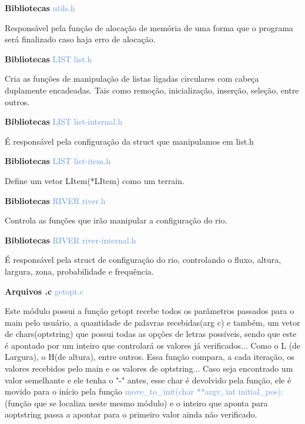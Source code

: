 \documentclass[a4paper,12pt]{article}
\begin{document}
{\Large \textcolor{NavyBlue}{ \textbf{Bibliotecas  }}}{\large \textcolor{CornflowerBlue}{  utils.h}}
\bigskip

Responsável pela função de alocação de memória de uma forma que o programa será finalizado caso haja erro de alocação.


\newpage %

{\Large \textcolor{NavyBlue}{ \textbf{Bibliotecas  }}}{\large \textcolor{CornflowerBlue}{  LIST  list.h}}
\bigskip

Cria as funções de manipulação de listas ligadas circulares com cabeça duplamente encadeadas. Tais como remoção, inicialização, inserção, seleção, entre outros.
\bigskip
\bigskip
\bigskip

{\Large \textcolor{NavyBlue}{ \textbf{Bibliotecas  }}}{\large \textcolor{CornflowerBlue}{  LIST  list-internal.h}}
\bigskip

É responsável pela configuração da struct que manipulamos em list.h
\bigskip
\bigskip
\bigskip

{\Large \textcolor{NavyBlue}{ \textbf{Bibliotecas  }}}{\large \textcolor{CornflowerBlue}{  LIST  list-item.h}}
\bigskip

Define um vetor LItem(*LItem) como um terrain.
\bigskip
\bigskip
\bigskip

{\Large \textcolor{NavyBlue}{ \textbf{Bibliotecas  }}}{\large \textcolor{CornflowerBlue}{  RIVER  river.h}}
\bigskip

Controla as funções que irão manipular a configuração do rio.
\bigskip
\bigskip
\bigskip

{\Large \textcolor{NavyBlue}{ \textbf{Bibliotecas  }}}{\large \textcolor{CornflowerBlue}{  RIVER  river-internal.h}}
\bigskip

É responsável pela struct de configuração do rio, controlando o fluxo, altura, largura, zona, probabilidade e frequência.


\newpage %

{\Large \textcolor{NavyBlue}{ \textbf{Arquivos .c  }}}{\large \textcolor{CornflowerBlue}{  getopt.c}}
\bigskip

Este módulo possui a função getopt recebe todos os parâmetros passados para o main pelo usuário, a quantidade de palavras recebidas(arg c) e também, um vetor de chars(optstring) que possui todas as opções de letras possíveis, sendo que este é apontado por um inteiro que controlará os valores já verificados... Como o L (de Largura), o H(de altura), entre outros. Essa função compara, a cada iteração, os valores recebidos pelo main e os valores de optstring... Caso seja encontrado um valor semelhante e ele tenha o "-" antes, esse char é devolvido pela função, ele é movido para o início pela função {\textcolor{CornflowerBlue}{move\_to\_init(char **argv, int initial\_pos);}} (função que se localiza neste mesmo módulo) e o inteiro que aponta para aoptstring passa a apontar para o primeiro valor ainda não verificado.
\end{document}
